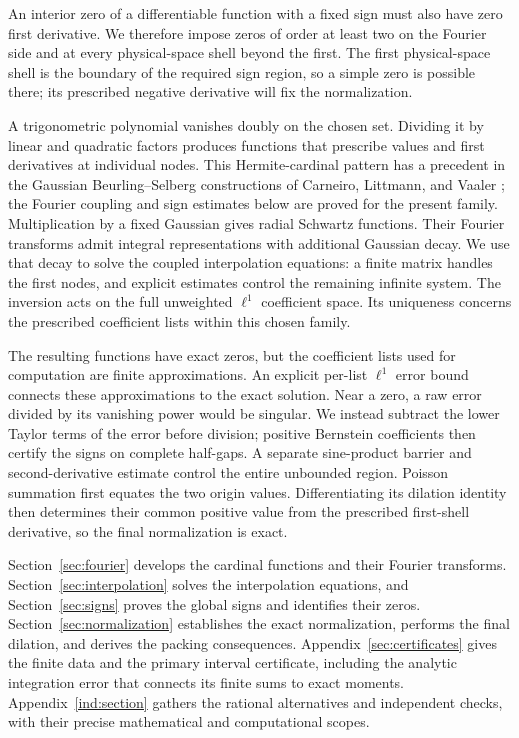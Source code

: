 An interior zero of a differentiable function with a fixed sign must
also have zero first derivative. We therefore impose zeros of order
at least two on the Fourier side and at every physical-space shell
beyond the first. The first physical-space shell is the boundary of
the required sign region, so a simple zero is possible there; its
prescribed negative derivative will fix the normalization.

A trigonometric polynomial vanishes doubly on the chosen set.
Dividing it by linear and quadratic factors produces functions
that prescribe values and first derivatives at individual nodes.
This Hermite-cardinal pattern has a precedent in the Gaussian
Beurling--Selberg constructions of Carneiro, Littmann, and Vaaler
\cite[formulas~(1.2)--(1.3)]{CarneiroLittmannVaaler2013}; the Fourier
coupling and sign estimates below are proved for the present family.
Multiplication by a fixed Gaussian gives radial Schwartz functions.
Their Fourier transforms admit integral representations with
additional Gaussian decay. We use that decay to solve the coupled
interpolation equations: a finite matrix handles the first nodes,
and explicit estimates control the remaining infinite system. The inversion
acts on the full unweighted $\ell^1$ coefficient space. Its uniqueness
concerns the prescribed coefficient lists within this chosen family.

The resulting functions have exact zeros, but the coefficient
lists used for computation are finite approximations.
An explicit per-list $\ell^1$ error bound connects these approximations
to the exact solution. Near a zero, a raw error divided by its vanishing
power would be singular. We instead subtract the lower Taylor terms of
the error before division; positive Bernstein coefficients then certify
the signs on complete half-gaps. A separate sine-product barrier and
second-derivative estimate control the entire unbounded region.
Poisson summation first equates the two origin values.
Differentiating its dilation identity then determines their common
positive value from the prescribed first-shell derivative, so the
final normalization is exact.

Section~\ref{sec:fourier} develops the cardinal functions and their
Fourier transforms. Section~\ref{sec:interpolation} solves the
interpolation equations, and Section~\ref{sec:signs} proves the
global signs and identifies their zeros. Section~\ref{sec:normalization}
establishes the exact normalization, performs the final dilation, and
derives the packing consequences. Appendix~\ref{sec:certificates} gives
the finite data and the primary interval certificate, including the
analytic integration error that connects its finite sums to exact moments.
Appendix~\ref{ind:section} gathers the rational alternatives and
independent checks, with their precise mathematical and computational
scopes.
